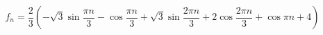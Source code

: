 \[f_n=\frac{2}{3}\left(-\sqrt{3}\sin\frac{\pi n}{3}-\cos\frac{\pi n}{3}+\sqrt{3}\sin\frac{2\pi n}{3}+2\cos\frac{2\pi n}{3}+\cos\pi n+4\right)\]
